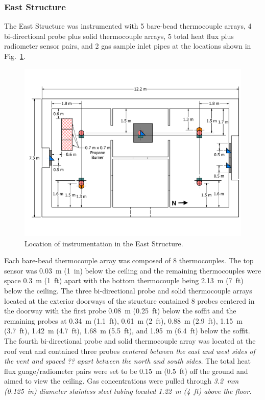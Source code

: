 \documentclass[12pt,oneside]{book}
\begin{document}
\subsubsection*{East Structure}
The East Structure was instrumented with 5 bare-bead thermocouple arrays, 4 bi-directional probe plus solid thermocouple arrays, 5 total heat flux plus radiometer sensor pairs, and 2 gas sample inlet pipes at the locations shown in Fig.~\ref{fig:east_instrumentation}.

\begin{figure}[!ht]
	\includegraphics[width=\columnwidth]{../Figures/Floor_Plans/East_Structure_Dimensioned_Instrumentation}
	\caption{Location of instrumentation in the East Structure.}
	\label{fig:east_instrumentation}
\end{figure}

Each bare-bead thermocouple array was composed of 8 thermocouples. The top sensor was 0.03~m (1~in) below the ceiling and the remaining thermocouples were space 0.3~m (1~ft) apart with the bottom thermocouple being 2.13~m (7~ft) below the ceiling. The three bi-directional probe and solid thermocouple arrays located at the exterior doorways of the structure contained 8 probes centered in the doorway with the first probe 0.08~m (0.25~ft) below the soffit and the remaining probes at 0.34~m (1.1~ft), 0.61~m (2~ft), 0.88~m (2.9~ft), 1.15~m (3.7~ft), 1.42~m (4.7~ft), 1.68~m (5.5~ft), and 1.95~m (6.4~ft) below the soffit. The fourth bi-directional probe and solid thermocouple array was located at the roof vent and contained three probes \textit{centered between the east and west sides of the vent and spaced ?? apart between the north and south sides.} The total heat flux guage/radiometer pairs were set to be 0.15~m (0.5~ft) off the ground and aimed to view the ceiling. Gas concentrations were pulled through \textit{3.2~mm (0.125~in) diameter stainless steel tubing located 1.22~m (4~ft) above the floor.}
\FloatBarrier
\end{document}
